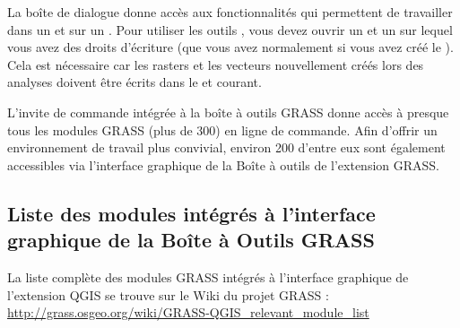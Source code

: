 {%
La boîte de dialogue  donne accès aux fonctionnalités \grass qui permettent de travailler dans un  et sur un . Pour utiliser les outils \grass, vous devez ouvrir un  et un  sur lequel vous avez des droits d'écriture (que vous avez normalement si vous avez créé le ). Cela est nécessaire car les rasters et les vecteurs nouvellement créés lors des analyses doivent être écrits dans le  et  courant.

L'invite de commande intégrée à la boîte à outils GRASS donne accès à presque tous les modules GRASS (plus de 300) en ligne de commande. Afin d'offrir un environnement de travail plus convivial, environ 200 d'entre eux sont également accessibles via l'interface graphique de la Boîte à outils de l'extension GRASS.

\subsection{Liste des modules intégrés à l'interface graphique de la Boîte à Outils GRASS}

La liste complète des modules GRASS intégrés à l'interface graphique de l'extension QGIS se trouve sur le Wiki du projet GRASS : \url{http://grass.osgeo.org/wiki/GRASS-QGIS_relevant_module_list}

}
